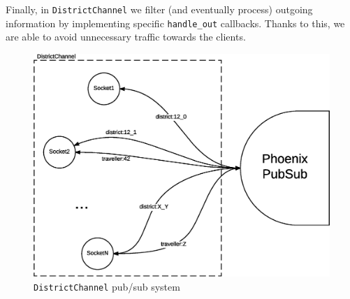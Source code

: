 Finally, in \texttt{DistrictChannel} we filter (and eventually process)
outgoing information by implementing specific \texttt{handle\_out} callbacks.
Thanks to this, we are able to avoid unnecessary traffic towards the clients.

\begin{figure}[H]
  \centering
  \includegraphics[width=\columnwidth]{images/implementation/as-chan-pubsub.eps}
  \caption{\texttt{DistrictChannel} pub/sub system}
  \label{fig:impl-as-pubsub}
\end{figure}

